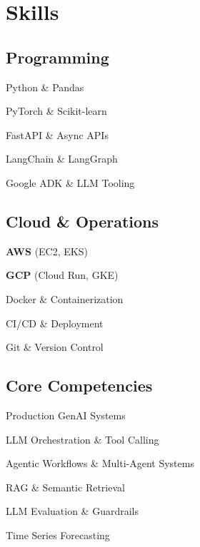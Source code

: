 \documentclass{seb-cv}
\begin{document}
\hfill
\begin{minipage}[t]{0.31\textwidth}

\section{Skills}

\subsection{Programming}
\begin{tightemize}
  \item Python \& Pandas
  \item PyTorch \& Scikit-learn
  \item FastAPI \& Async APIs
  \item LangChain \& LangGraph
  \item Google ADK \& LLM Tooling
\end{tightemize}

\entrysep

\subsection{Cloud \& Operations}
\begin{tightemize}
  \item \textbf{AWS} (EC2, EKS)
  \item \textbf{GCP} (Cloud Run, GKE)
  \item Docker \& Containerization
  \item CI/CD \& Deployment
  \item Git \& Version Control
\end{tightemize}

\entrysep

\subsection{Core Competencies}
\begin{tightemize}
  \item Production GenAI Systems
  \item LLM Orchestration \& Tool Calling
  \item Agentic Workflows \& Multi-Agent Systems
  \item RAG \& Semantic Retrieval
  \item LLM Evaluation \& Guardrails
  \item Time Series Forecasting
\end{tightemize}


\end{minipage}
\end{document}
